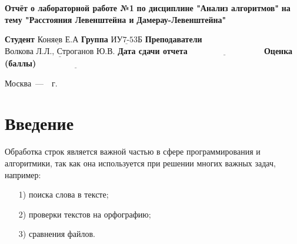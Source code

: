 \documentclass[12pt]{report}
\begin{document}
\begin{titlepage}
		
		\begin{center}
			\noindent\begin{minipage}{1.3\textwidth}\centering
				\Large\textbf{  Отчёт о лабораторной работе №1}\newline
				\textbf{по дисциплине "Анализ алгоритмов"}\newline
				\textbf{на тему "Расстояния Левенштейна и}\newline
				\textbf{Дамерау-Левенштейна"}\newline\newline
			\end{minipage}
		\end{center}
		
		\noindent\textbf{Студент} $\underline{\text{Коняев Е.А}}$\newline\newline
		\noindent\textbf{Группа} $\underline{\text{ИУ7-53Б}}$\newline\newline
		\noindent\textbf{Преподаватели} $\underline{\text{Волкова Л.Л., Строганов Ю.В.}}$\newline\newline
		\noindent\textbf{Дата сдачи отчета}$\underline{\text{~~~~~~~~~~~~~~~~~~~~~~~~~~~}}$\newline\newline
		\noindent\textbf{Оценка (баллы)} $\underline{\text{~~~~~~~~~~~~~~~~~~~~~~~~~~~}}$\newline\newline\newline
		
		\begin{center}
			\vfill
			Москва~---~\the\year~г.
		\end{center}
	\end{titlepage}
	
	\setcounter{page}{2}
	\tableofcontents
	
	\newpage
	\chapter*{Введение}
	
	
	
Обработка строк является важной частью в сфере программирования и алгоритмики, так как она используется при решении многих важных задач, например:

\begin{enumerate}
	\item[1)] поиска слова в тексте;
	\item[2)] проверки текстов на орфографию;
	\item[3)] сравнения файлов.
\end{enumerate}
\end{document}
